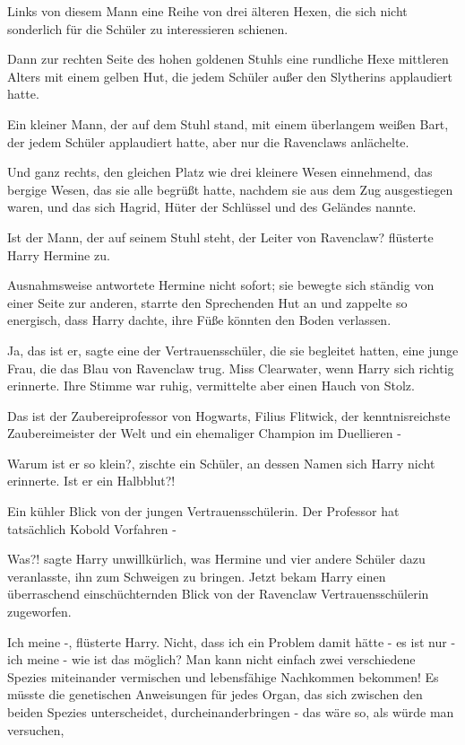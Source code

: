 Links von diesem Mann eine Reihe von drei älteren Hexen, die sich nicht
sonderlich für die Schüler zu interessieren schienen.

Dann zur rechten Seite des hohen goldenen Stuhls eine rundliche Hexe mittleren
Alters mit einem gelben Hut, die jedem Schüler außer den Slytherins applaudiert
hatte.

Ein kleiner Mann, der auf dem Stuhl stand, mit einem überlangem weißen Bart, der
jedem Schüler applaudiert hatte, aber nur die Ravenclaws anlächelte.

Und ganz rechts, den gleichen Platz wie drei kleinere Wesen einnehmend, das
bergige Wesen, das sie alle begrüßt hatte, nachdem sie aus dem Zug ausgestiegen
waren, und das sich Hagrid, Hüter der Schlüssel und des Geländes nannte.

\glqq Ist der Mann, der auf seinem Stuhl steht, der Leiter von Ravenclaw?\grqq{}
flüsterte Harry Hermine zu.

Ausnahmsweise antwortete Hermine nicht sofort; sie bewegte sich ständig von
einer Seite zur anderen, starrte den Sprechenden Hut an und zappelte so
energisch, dass Harry dachte, ihre Füße könnten den Boden verlassen.

\glqq Ja, das ist er\grqq{}, sagte eine der Vertrauensschüler, die sie
begleitet hatten, eine junge Frau, die das Blau von Ravenclaw trug. Miss
Clearwater, wenn Harry sich richtig erinnerte. Ihre Stimme war ruhig,
vermittelte aber einen Hauch von Stolz.

\glqq Das ist der Zaubereiprofessor von Hogwarts, Filius Flitwick, der
kenntnisreichste Zaubereimeister der Welt und ein ehemaliger Champion im
Duellieren -\grqq{}

\glqq Warum ist er so klein?\grqq{}, zischte ein Schüler, an dessen Namen sich
Harry nicht erinnerte. \glqq Ist er ein Halbblut?!\grqq{}

Ein kühler Blick von der jungen Vertrauensschülerin. \glqq Der Professor hat
tatsächlich Kobold Vorfahren -\grqq{}

\glqq Was?!\grqq{} sagte Harry unwillkürlich, was Hermine und vier andere
Schüler dazu veranlasste, ihn zum Schweigen zu bringen. Jetzt bekam Harry einen
überraschend einschüchternden Blick von der Ravenclaw Vertrauensschülerin
zugeworfen.

\glqq Ich meine -\grqq{}, flüsterte Harry. \glqq Nicht, dass ich ein Problem
damit hätte - es ist nur - ich meine - wie ist das möglich? Man kann nicht
einfach zwei verschiedene Spezies miteinander vermischen und lebensfähige
Nachkommen bekommen! Es müsste die genetischen Anweisungen für jedes Organ, das
sich zwischen den beiden Spezies unterscheidet, durcheinanderbringen - das wäre
so, als würde man versuchen,\grqq{}

